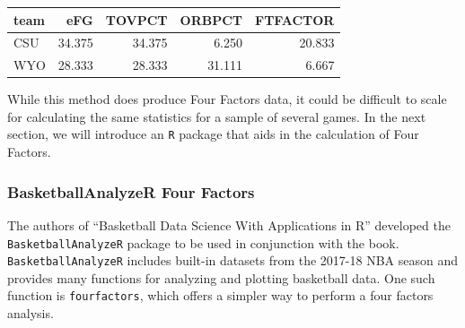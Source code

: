 \documentclass[
  11pt,
]{book}
\newenvironment{Shaded}{\begin{snugshade}}{\end{snugshade}}
\newcommand{\CommentTok}[1]{\textcolor[rgb]{0.56,0.35,0.01}{\textit{#1}}}
\newcommand{\DecValTok}[1]{\textcolor[rgb]{0.00,0.00,0.81}{#1}}
\newcommand{\FunctionTok}[1]{\textcolor[rgb]{0.00,0.00,0.00}{#1}}
\newcommand{\NormalTok}[1]{#1}
\newcommand{\OtherTok}[1]{\textcolor[rgb]{0.56,0.35,0.01}{#1}}
\newcommand{\SpecialCharTok}[1]{\textcolor[rgb]{0.00,0.00,0.00}{#1}}
\newcommand{\StringTok}[1]{\textcolor[rgb]{0.31,0.60,0.02}{#1}}
\theoremstyle{definition}
\theoremstyle{definition}
\theoremstyle{definition}
\theoremstyle{definition}
\theoremstyle{remark}
\begin{document}
\begin{table}[H]
\centering
\begin{tabular}{lrrrr}
\toprule
team & eFG & TOVPCT & ORBPCT & FTFACTOR\\
\midrule
CSU & 34.375 & 34.375 & 6.250 & 20.833\\
WYO & 28.333 & 28.333 & 31.111 & 6.667\\
\bottomrule
\end{tabular}
\end{table}

While this method does produce Four Factors data, it could be difficult to scale for calculating the same statistics for a sample of several games. In the next section, we will introduce an \texttt{R} package that aids in the calculation of Four Factors.

\hypertarget{basketballanalyzer-four-factors}{%
\subsubsection{BasketballAnalyzeR Four Factors}\label{basketballanalyzer-four-factors}}

The authors of ``Basketball Data Science With Applications in R'' developed the \texttt{BasketballAnalyzeR} package to be used in conjunction with the book. \texttt{BasketballAnalyzeR} includes built-in datasets from the 2017-18 NBA season and provides many functions for analyzing and plotting basketball data. One such function is \texttt{fourfactors}, which offers a simpler way to perform a four factors analysis.

\begin{Shaded}
\end{Shaded}
\end{document}
